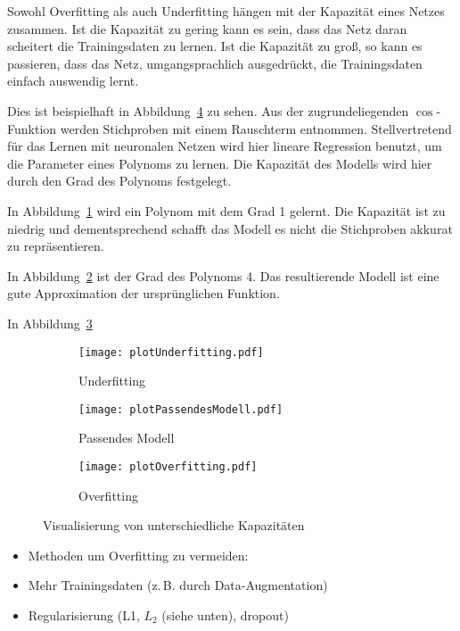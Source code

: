 Sowohl Overfitting als auch Underfitting hängen mit der Kapazität eines Netzes zusammen.
Ist die Kapazität zu gering kann es sein, dass das Netz daran scheitert die Trainingsdaten zu lernen.
Ist die Kapazität zu groß, so kann es passieren, dass das Netz, umgangsprachlich ausgedrückt, die Trainingsdaten einfach auswendig lernt.

Dies ist beispielhaft in Abbildung~\ref{fig:capacity} zu sehen.
Aus der zugrundeliegenden \( \cos \)-Funktion werden Stichproben mit einem Rauschterm entnommen. 
Stellvertretend für das Lernen mit neuronalen Netzen wird hier lineare Regression benutzt,
um die Parameter eines Polynoms zu lernen.
Die Kapazität des Modells wird hier durch den Grad des Polynoms festgelegt.

In Abbildung~\ref{subfig:underfitting} wird ein Polynom mit dem Grad 1 gelernt.
Die Kapazität ist zu niedrig und dementsprechend schafft das Modell es nicht die Stichproben akkurat zu repräsentieren.

In Abbildung~\ref{subfig:rightfitting} ist der Grad des Polynoms 4.
Das resultierende Modell ist eine gute Approximation der ursprünglichen Funktion.

In Abbildung~\ref{subfig:overfitting}

\begin{figure}[h]
    \centering
	
	\begin{subfigure}[t]{0.6\textwidth}
		\texttt{[image: plotUnderfitting.pdf]}
		\caption{Underfitting}
		\label{subfig:underfitting}
	\end{subfigure}
	\begin{subfigure}[t]{0.6\textwidth}
		\texttt{[image: plotPassendesModell.pdf]}
		\caption{Passendes Modell}
		\label{subfig:rightfitting}
	\end{subfigure}
	\begin{subfigure}[t]{0.6\textwidth}
        \texttt{[image: plotOverfitting.pdf]}
		\caption{Overfitting}
		\label{subfig:overfitting}
	\end{subfigure}
	\caption{Visualisierung von unterschiedliche Kapazitäten}
	\label{fig:capacity}
\end{figure}

\begin{itemize}
	\item Methoden um Overfitting zu vermeiden:
	\item Mehr Trainingsdaten (z.\,B. durch Data-Augmentation)
	\item Regularisierung (L1, \(L_2\) (siehe unten), dropout)
\end{itemize}


